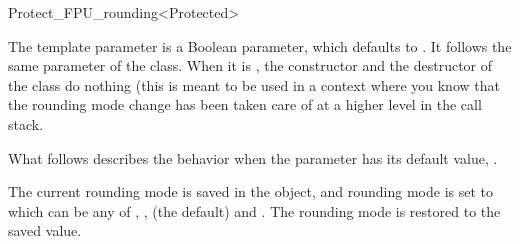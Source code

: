 \begin{ccRefClass}{Protect_FPU_rounding<Protected>}

\ccParameters

The template parameter  is a Boolean parameter, which defaults
to .  It follows the same parameter of the  class.
When it is , the constructor and the destructor of the class do
nothing (this is meant to be used in a context where you know that the rounding
mode change has been taken care of at a higher level in the call stack.

What follows describes the behavior when the parameter has its default value,
.

\ccCreation

{The current rounding mode is saved in the object, and rounding mode is set to 
which can be any of , ,
 (the default) and .}
\ccGlue
{}
{The rounding mode is restored to the saved value.}

\ccSeeAlso
{}

\end{ccRefClass}
